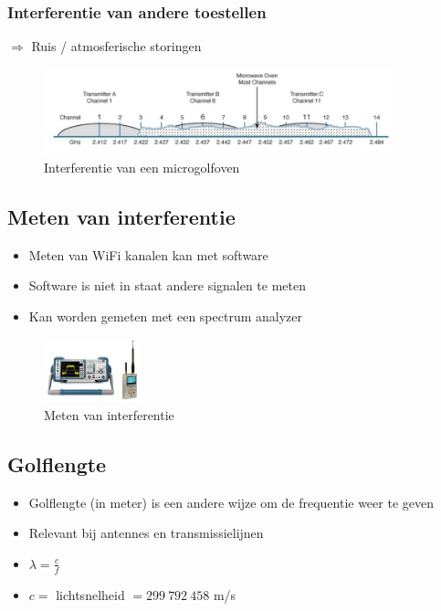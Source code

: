 \documentclass{article}
\begin{document}
\subsubsection{Interferentie van andere toestellen}
$\Rightarrow$ Ruis / atmosferische storingen

\begin{figure}[H]
    \centering
    \includegraphics[width=0.9\textwidth]{Screenshot_20200309_120624.png}
    \caption{Interferentie van een microgolfoven}
\end{figure}

\subsection{Meten van interferentie}
\begin{itemize}
    \item Meten van WiFi kanalen kan met software 
    \item Software is niet in staat andere signalen te meten
    \item Kan worden gemeten met een spectrum analyzer
\end{itemize}

\begin{figure}[H]
    \centering
    \includegraphics[width=0.25\textwidth]{Screenshot_20200309_120748.png}
    \caption{Meten van interferentie}
\end{figure}

\subsection{Golflengte}
\begin{itemize}
    \item Golflengte (in meter) is een andere wijze om de frequentie weer te geven
    \item Relevant bij antennes en transmissielijnen
    \item $\lambda = \frac{c}{f}$
    \item $c=$ lichtsnelheid $= 299\ 792\ 458$  m/s
\end{itemize}
\end{document}
